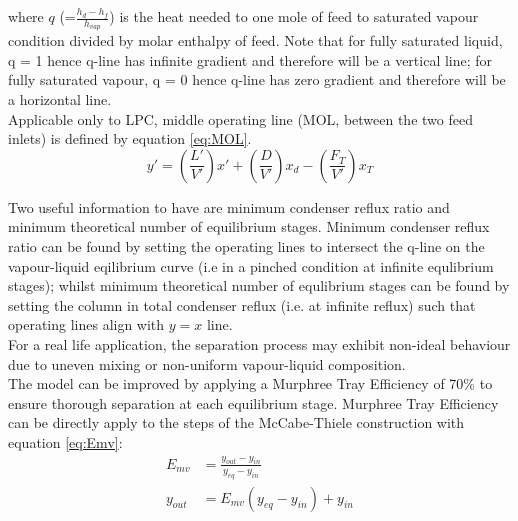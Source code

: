 \documentclass[11pt,oneside]{article}
\begin{document}
        where $q$ (=$\frac{h_d-h_f}{h_{vap}}$) is the heat needed to one mole of feed to saturated vapour condition divided by molar enthalpy of feed. Note that for fully saturated liquid, q = 1 hence q-line has infinite gradient and therefore will be a vertical line; for fully saturated vapour, q = 0 hence q-line has zero gradient and therefore will be a horizontal line.\\
        Applicable only to LPC, middle operating line (MOL, between the two feed inlets) is defined by equation \ref{eq:MOL}. \\
        \begin{equation}
            y' = \left(\frac{L'}{V'}\right)x' + \left(\frac{D}{V'}\right)x_d -  \left(\frac{F_T}{V'}\right)x_T
            \label{eq:MOL}
        \end{equation}
        
        \noindent Two useful information to have are minimum condenser reflux ratio and minimum theoretical number of equilibrium stages. Minimum condenser reflux ratio can be found by setting the operating lines to intersect the q-line on the vapour-liquid eqilibrium curve (i.e in a pinched condition at infinite equlibrium stages); whilst minimum theoretical number of equlibrium stages can be found by setting the column in total condenser reflux (i.e. at infinite reflux) such that operating lines align with $y=x$ line.\\
        For a real life application, the separation process may exhibit non-ideal behaviour due to uneven mixing or non-uniform vapour-liquid composition. \\
        The model can be improved by applying a Murphree Tray Efficiency of 70\% to ensure thorough separation at each equilibrium stage. Murphree Tray Efficiency can be directly apply to the steps of the McCabe-Thiele construction with equation \ref{eq:Emv}: \\
        \begin{equation}
            \begin{aligned}
                E_{mv} & = \frac{y_{out} - y_{in}}{y_{eq} - y_{in}} \\
                y_{out} & = E_{mv}\left(y_{eq}-y_{in}\right) + y_{in}
            \end{aligned}
            \label{eq:Emv}
        \end{equation}
        
\end{document}
